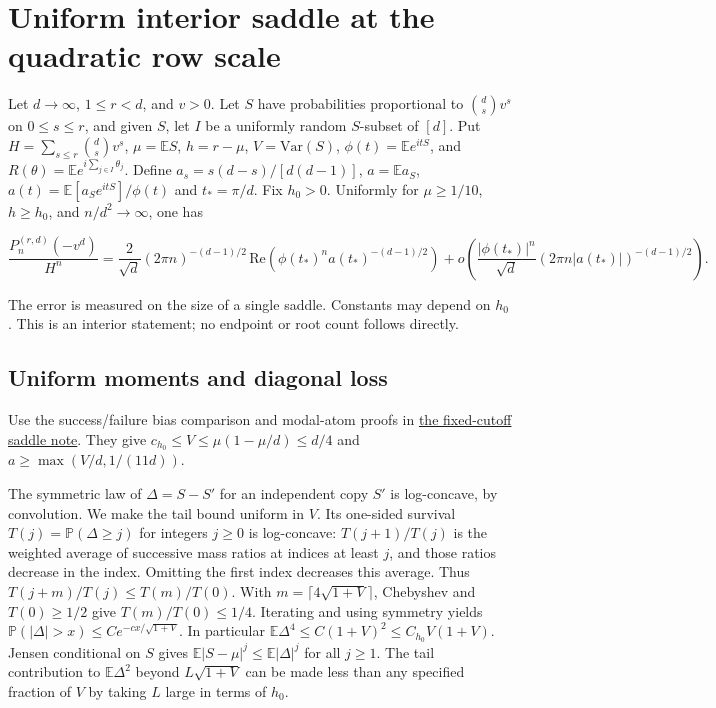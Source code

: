 \section{Uniform interior saddle at the quadratic row scale}\label{sec:quadratic-interior-saddle}

Let $d\to\infty$, $1\le r<d$, and $v>0$. Let $S$ have probabilities proportional to $\binom ds v^s$ on $0\le s\le r$, and given $S$, let $I$ be a uniformly random $S$-subset of $[d]$. Put $H=\sum_{s\le r}\binom ds v^s$, $\mu=\mathbb ES$, $h=r-\mu$, $V=\mathrm{Var}(S)$, $\phi(t)=\mathbb E e^{itS}$, and $R(\theta)=\mathbb E e^{i\sum_{j\in I}\theta_j}$. Define $a_s=s(d-s)/[d(d-1)]$, $a=\mathbb E a_S$, $a(t)=\mathbb E[a_S e^{itS}]/\phi(t)$ and $t_*=\pi/d$. Fix $h_0>0$. Uniformly for $\mu\ge1/10$, $h\ge h_0$, and $n/d^2\to\infty$, one has

\begin{equation*}
\frac{P_n^{(r,d)}(-v^d)}{H^n}
=\frac{2}{\sqrt d}(2\pi n)^{-(d-1)/2}\,
\mathrm{Re}\!\left(\phi(t_*)^n a(t_*)^{-(d-1)/2}\right)
+o\!\left(\frac{|\phi(t_*)|^n}{\sqrt d}(2\pi n|a(t_*)|)^{-(d-1)/2}\right).
\end{equation*}

The error is measured on the size of a single saddle. Constants may depend on $h_0$. This is an interior statement; no endpoint or root count follows directly.

\subsection{Uniform moments and diagonal loss}

Use the success/failure bias comparison and modal-atom proofs in \href{https://github.com/ProgramComputer/open-math-research/blob/04564a728c21eab6ce511b98a48ccaac754648ff/topics/balanced-arrays/very-tall/very-tall-interior-saddle.md}{the fixed-cutoff saddle note}. They give $c_{h_0}\le V\le\mu(1-\mu/d)\le d/4$ and $a\ge \max(V/d,1/(11d))$.

The symmetric law of $\Delta=S-S'$ for an independent copy $S'$ is log-concave, by convolution. We make the tail bound uniform in $V$. Its one-sided survival $T(j)=\mathbb P(\Delta\ge j)$ for integers $j\ge0$ is log-concave: $T(j+1)/T(j)$ is the weighted average of successive mass ratios at indices at least $j$, and those ratios decrease in the index. Omitting the first index decreases this average. Thus $T(j+m)/T(j)\le T(m)/T(0)$. With $m=\lceil 4\sqrt{1+V}\rceil$, Chebyshev and $T(0)\ge1/2$ give $T(m)/T(0)\le1/4$. Iterating and using symmetry yields $\mathbb P(|\Delta|>x)\le C e^{-c x/\sqrt{1+V}}$. In particular $\mathbb E\Delta^4\le C(1+V)^2\le C_{h_0}V(1+V)$. Jensen conditional on $S$ gives $\mathbb E|S-\mu|^j\le\mathbb E|\Delta|^j$ for all $j\ge1$. The tail contribution to $\mathbb E\Delta^2$ beyond $L\sqrt{1+V}$ can be made less than any specified fraction of $V$ by taking $L$ large in terms of $h_0$.

